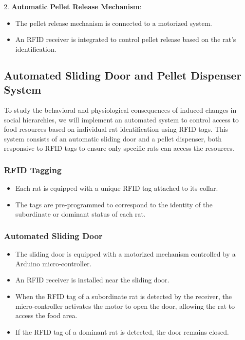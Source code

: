 \documentclass[english, a4paper, 11pt]{article}
\begin{document}
2. \textbf{Automatic Pellet Release Mechanism}:
\begin{itemize}
    \item The pellet release mechanism is connected to a motorized system.
    \item An RFID receiver is integrated to control pellet release based on the rat's identification.
\end{itemize}

\subsection*{Automated Sliding Door and Pellet Dispenser System}

To study the behavioral and physiological consequences of induced changes in social hierarchies, we will implement an automated system to control access to food resources based on individual rat identification using RFID tags\cite{habedankMouseWhereArt2020}. This system consists of an automatic sliding door and a pellet dispenser, both responsive to RFID tags to ensure only specific rats can access the resources.

\subsubsection*{RFID Tagging}
\begin{itemize}
    \item Each rat is equipped with a unique RFID tag attached to its collar.
    \item The tags are pre-programmed to correspond to the identity of the subordinate or dominant status of each rat.
\end{itemize}

\subsubsection*{Automated Sliding Door}
\begin{itemize}
    \item The sliding door is equipped with a motorized mechanism controlled by a Arduino micro-controller.
    \item An RFID receiver is installed near the sliding door.
    \item When the RFID tag of a subordinate rat is detected by the receiver, the micro-controller activates the motor to open the door, allowing the rat to access the food area.
    \item If the RFID tag of a dominant rat is detected, the door remains closed.
\end{itemize}
\end{document}
